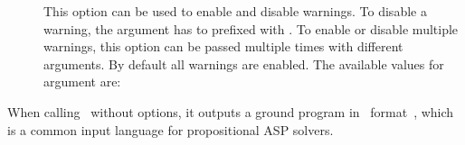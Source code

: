\begin{description}
\item[]
This option can be used to enable and disable warnings.
To disable a warning, the argument has to prefixed with .
To enable or disable multiple warnings, this option can be passed multiple times with different arguments.
By default all warnings are enabled.
The available values for argument  are:
\end{description}
%
When calling \gringo\ without options,
it outputs a ground program in \smodels\ format~\cite{lparseManual},
which is a common input language for propositional ASP solvers.

